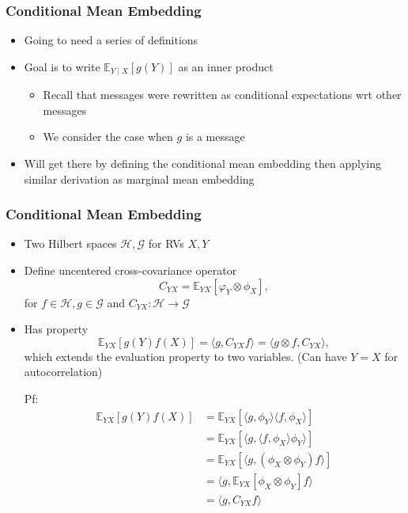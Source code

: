 \documentclass{beamer}
\begin{document}
\begin{frame}
\frametitle{Conditional Mean Embedding}
\begin{itemize}
\item Going to need a series of definitions
\vspace{2em}
\item Goal is to write $\mathbb{E}_{Y \mid X}[g(Y)]$ as an inner product
    \vspace{1em}
    \begin{itemize}
    \item Recall that messages were rewritten as conditional expectations wrt
    other messages
    \vspace{1em}
    \item  We consider the case when $g$ is a message
    \end{itemize}
\vspace{1em}
\item Will get there by defining the conditional mean embedding
    then applying similar derivation as marginal mean embedding
\end{itemize}
\end{frame}

\begin{frame}
\frametitle{Conditional Mean Embedding}
\begin{itemize}
\item Two Hilbert spaces $\mathscr{H},\mathscr{G}$ for RVs $X,Y$
\item Define uncentered cross-covariance operator
$$C_{YX} = \mathbb{E}_{YX}[\varphi_Y\otimes\phi_X],$$
for $f \in \mathscr{H}, g \in \mathscr{G}$ and $C_{YX}: \mathscr{H} \to \mathscr{G}$
\item Has property
$$\mathbb{E}_{YX}[g(Y)f(X)] = \langle g, C_{YX}f\rangle = \langle g\otimes f, C_{YX} \rangle,$$
which extends the evaluation property to two variables.
(Can have $Y = X$ for autocorrelation)

Pf:
\begin{align*}
\mathbb{E}_{YX}[g(Y)f(X)]
&= \mathbb{E}_{YX}[\langle g, \phi_Y\rangle \langle f, \phi_X \rangle]\\
&= \mathbb{E}_{YX}[\langle g, \langle f, \phi_X\rangle \phi_Y  \rangle]\\
&= \mathbb{E}_{YX}[\langle g, (\phi_X \otimes \phi_Y)f  \rangle]\\
&= \langle g, \mathbb{E}_{YX}[\phi_X \otimes \phi_Y]f  \rangle\\
&= \langle g, C_{YX}f  \rangle
\end{align*}
\end{itemize}
\end{frame}
\end{document}
